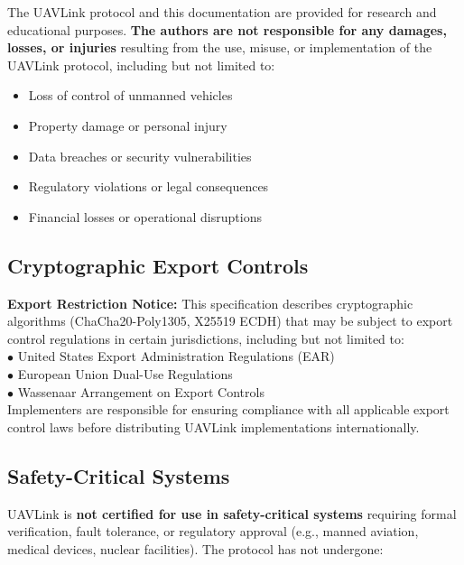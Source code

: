 \documentclass[11pt,a4paper]{article}
\begin{document}
\vspace{0.5cm}

The UAVLink protocol and this documentation are provided for research and educational purposes. \textbf{The authors are not responsible for any damages, losses, or injuries} resulting from the use, misuse, or implementation of the UAVLink protocol, including but not limited to:

\begin{itemize}[noitemsep]
\item Loss of control of unmanned vehicles
\item Property damage or personal injury
\item Data breaches or security vulnerabilities
\item Regulatory violations or legal consequences
\item Financial losses or operational disruptions
\end{itemize}

\subsection*{Cryptographic Export Controls}

\begin{alertbox}
\textbf{Export Restriction Notice:} This specification describes cryptographic algorithms (ChaCha20-Poly1305, X25519 ECDH) that may be subject to export control regulations in certain jurisdictions, including but not limited to:\\[0.3cm]
$\bullet$ United States Export Administration Regulations (EAR)\\[0.1cm]
$\bullet$ European Union Dual-Use Regulations\\[0.1cm]
$\bullet$ Wassenaar Arrangement on Export Controls\\[0.3cm]
Implementers are responsible for ensuring compliance with all applicable export control laws before distributing UAVLink implementations internationally.
\end{alertbox}

\subsection*{Safety-Critical Systems}

UAVLink is \textbf{not certified for use in safety-critical systems} requiring formal verification, fault tolerance, or regulatory approval (e.g., manned aviation, medical devices, nuclear facilities). The protocol has not undergone:
\end{document}
